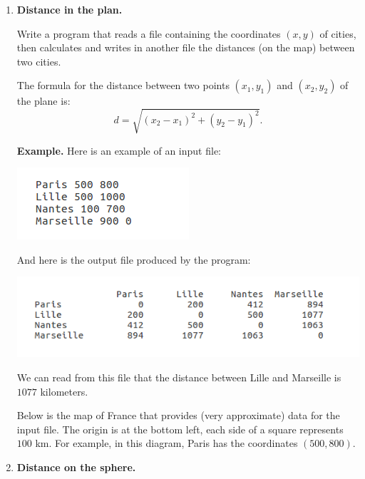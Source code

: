 \documentclass[11pt,class=report,crop=false]{standalone}
\begin{document}
\begin{activite}


\begin{enumerate}
  \item \textbf{Distance in the plan.} 
  
  Write a program that reads a file containing the coordinates $(x,y)$ of cities, then calculates and writes in another file the distances (on the map) between two cities.
  
  The formula for the distance between two points $(x_1,y_1)$ and $(x_2,y_2)$ of the plane is:
  $$d = \sqrt{(x_2-x_1)^2 + (y_2-y_1)^2}.$$
  
  
\textbf{Example.} Here is an example of an input file:
\begin{center}
\includegraphics[scale=\myscale,scale=0.7]{screen-files-4a}
\end{center}   

And here is the output file produced by the program:
\begin{center}
\includegraphics[scale=\myscale,scale=0.7]{screen-files-4b} 
\end{center}   
We can read from this file that the distance between Lille and Marseille is $1077$ kilometers.


Below is the map of France that provides (very approximate) data for the input file. The origin is at the bottom left, each side of a square represents $100$ km. For example, in this diagram, Paris has the coordinates $(500,800)$.
 

  \item \textbf{Distance on the sphere.} 
  

\end{enumerate}
\end{activite}
\end{document}
